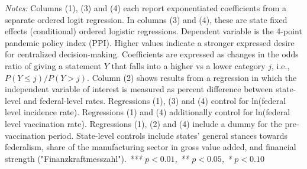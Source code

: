 \begin{table}[htbp]
\begin{minipage}{\textwidth}
\small 	\textit{Notes:} Columns (1), (3) and (4) each report exponentiated coefficients from a separate ordered logit regression. In columns (3) and (4), these are state fixed effects (conditional) ordered logistic regressions. Dependent variable is the 4-point pandemic policy index (PPI). Higher values indicate a stronger expressed desire for centralized decision-making. Coefficients are expressed as changes in the odds ratio of giving a statement $Y$ that falls into a higher vs a lower category $j$, i.e., $P(Y \leq j)/P(Y > j)$. Column (2) shows results from a regression in which the independent variable of interest is measured as percent difference between state-level and federal-level rates. Regressions (1), (3) and (4) control for ln(federal level incidence rate). Regressions (1) and (4) additionally control for ln(federal level vaccination rate). Regressions (1), (2) and (4) include a dummy for the pre-vaccination period. State-level controls include states' general stances towards federalism, share of the manufacturing sector in gross value added, and financial strength ("Finanzkraftmesszahl").
\newline \textit{*** $p < 0.01$, ** $p < 0.05$, * $p < 0.10$}
\end{minipage}
\end{table}